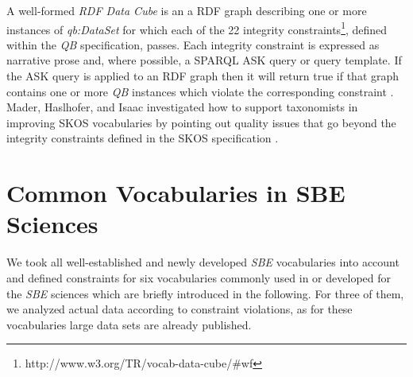 \documentclass{llncs}
\begin{document}

A well-formed \emph{RDF Data Cube} is an a RDF graph describing one or more instances of \emph{qb:DataSet} for which each of the 22 integrity constraints\footnote{http://www.w3.org/TR/vocab-data-cube/\#wf}, defined within the \emph{QB} specification, passes.
Each integrity constraint is expressed as narrative prose and, where possible, a SPARQL ASK query or query template. 
If the ASK query is applied to an RDF graph then it will return true if that graph contains one or more \emph{QB} instances which violate the corresponding constraint \cite{CyganiakReynolds2014}.
Mader, Haslhofer, and Isaac investigated how to support
taxonomists in improving SKOS vocabularies by pointing out quality
issues that go beyond the integrity constraints defined in the SKOS specification \cite{MaderHaslhoferIsaac2012}.
 
\section{Common Vocabularies in SBE Sciences}
\label{rdf-representation}


We took all well-established and newly developed \emph{SBE} vocabularies into account and defined constraints for six vocabularies commonly used in or developed for the \emph{SBE} sciences which are briefly introduced in the following.
For three of them, we analyzed actual data according to constraint violations, as for these vocabularies large data sets are already published.

\end{document}
